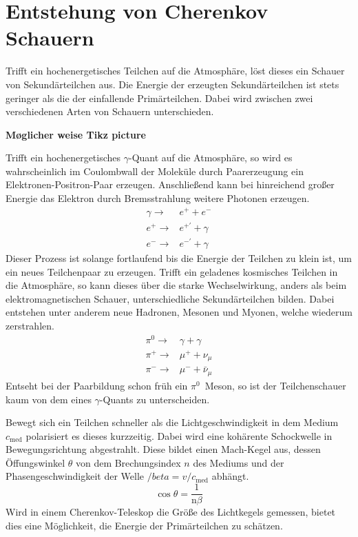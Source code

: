 \chapter{Entstehung von Cherenkov Schauern}
Trifft ein hochenergetisches Teilchen auf die Atmosphäre, löst dieses ein Schauer von Sekundärteilchen aus. Die Energie der erzeugten Sekundärteilchen ist stets geringer als die der einfallende Primärteilchen. Dabei wird zwischen zwei verschiedenen Arten von Schauern unterschieden. 

\textbf{Møglicher weise Tikz picture}

Trifft ein hochenergetisches $\gamma$-Quant auf die Atmosphäre, so wird es wahrscheinlich im Coulombwall der Moleküle durch Paarerzeugung ein Elektronen-Positron-Paar erzeugen. 
Anschließend kann bei hinreichend großer Energie das Elektron durch Bremsstrahlung weitere Photonen erzeugen. 
\begin{eqnarray}
  \gamma \rightarrow& e^{+} + e^{-} \\
  e^{+} \rightarrow& e^{+'} + \gamma \\
  e^{-} \rightarrow& e^{-'} + \gamma 
\end{eqnarray}
Dieser Prozess ist solange fortlaufend bis die Energie der Teilchen zu klein ist, um ein neues Teilchenpaar zu erzeugen. 
Trifft ein geladenes kosmisches Teilchen in die Atmosphäre, so kann dieses über die starke Wechselwirkung, anders als beim elektromagnetischen Schauer, unterschiedliche Sekundärteilchen bilden. 
Dabei entstehen unter anderem neue Hadronen, Mesonen und Myonen, welche wiederum zerstrahlen. 
\begin{eqnarray}
  \pi^{0} \rightarrow& \gamma + \gamma \\
  \pi^{+} \rightarrow& \mu^{+} + \nu_{\mu} \\
  \pi^{-} \rightarrow& \mu^{-} + \bar{\nu}_{\mu}
\end{eqnarray}
Entseht bei der Paarbildung schon früh ein $\pi^{0}$~Meson, so ist der Teilchenschauer kaum von dem eines $\gamma$-Quants zu unterscheiden. 

Bewegt sich ein Teilchen schneller als die Lichtgeschwindigkeit in dem Medium $c_\text{med}$ polarisiert es dieses kurzzeitig. 
Dabei wird eine kohärente Schockwelle in Bewegungsrichtung abgestrahlt. 
Diese bildet einen Mach-Kegel aus, dessen Öffungswinkel $\theta$ von dem Brechungsindex $n$ des Mediums und der Phasengeschwindigkeit der Welle $/beta = v / c_\text{med}$ abhängt.
\begin{equation}
  \cos  \theta = \frac{1}{\text{n} \beta}
\end{equation}
Wird in einem Cherenkov-Teleskop die Größe des Lichtkegels gemessen, bietet dies eine Möglichkeit, die Energie der Primärteilchen zu schätzen. 
